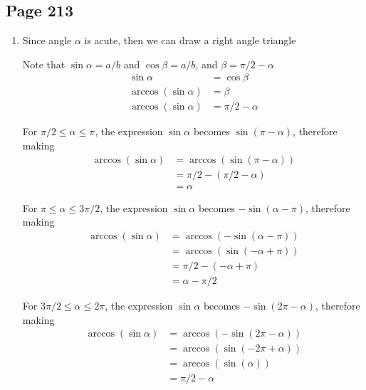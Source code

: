 \documentclass{article}
\newenvironment{solutions}[1]
{\subsection*{#1}
 \begin{enumerate}[leftmargin=1.5em]}
{\end{enumerate}}
\newcommand{\solution}{\item}
\begin{document}
\begin{solutions}{Page 213}
For $\pi \leq \theta 3\pi/2$, $\cos \theta = -\cos (\theta-\pi)$, making the sign negative

For $3\pi/2 \leq \theta 2\pi$, $\cos \theta = \cos (2\theta-\theta)$, making the sign positive

\solution
Since angle $\alpha$ is acute, then we can draw a right angle triangle 


Note that $\sin \alpha = a/b$ and $\cos \beta =a/b$, and $\beta = \pi/2-\alpha$
\begin{align*}
    \sin \alpha &= \cos \beta\\
    \arccos (\sin \alpha) &= \beta\\
    \arccos (\sin \alpha) &= \pi/2 - \alpha
\end{align*}

For $\pi/2 \leq \alpha \leq  \pi$, the expression $\sin\alpha$ becomes $\sin (\pi - \alpha)$, therefore making 
\begin{align*}
    \arccos(\sin \alpha) &= \arccos(\sin (\pi-\alpha))\\
                         &= \pi/2 - (\pi/2-\alpha)\\
                         &= \alpha
\end{align*}

For $\pi \leq \alpha \leq  3\pi/2$, the expression $\sin\alpha$ becomes $-\sin (\alpha - \pi)$, therefore making 
\begin{align*}
    \arccos(\sin \alpha) &= \arccos(-\sin (\alpha-\pi))\\
                         &= \arccos(\sin (-\alpha+\pi))\\
                         &= \pi/2 - (-\alpha + \pi)\\
                         &= \alpha-\pi/2
\end{align*}

For $3\pi/2 \leq \alpha \leq  2\pi$, the expression $\sin\alpha$ becomes $-\sin (2\pi - \alpha)$, therefore making 
\begin{align*}
    \arccos(\sin \alpha) &= \arccos(-\sin (2\pi-\alpha))\\
                        &= \arccos(\sin (-2\pi+\alpha))\\
                        &= \arccos(\sin (\alpha))\\
                         &= \pi/2 - \alpha
\end{align*}


\end{solutions}
\end{document}
